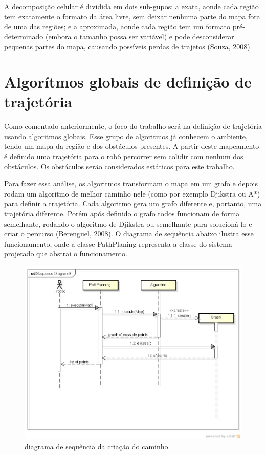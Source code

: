 A decomposição celular é dividida em dois sub-gupos: a exata, aonde cada região tem exatamente o formato da área livre, sem deixar nenhuma parte do mapa fora de uma das regiões; e a aproximada, aonde cada região tem um formato pré-determinado (embora o tamanho possa ser variável) e pode desconsiderar pequenas partes do mapa, causando possíveis perdas de trajetos (Souza, 2008).

\section{Algorítmos globais de definição de trajetória}

Como comentado anteriormente, o foco do trabalho será na definição de trajetória usando algoritmos globais. Esse grupo de algoritmos já conhecem o ambiente, tendo um mapa da região e dos obstáculos presentes. A partir deste mapeamento é definido uma trajetória para o robô percorrer sem colidir com nenhum dos obstáculos. Os obstáculos serão considerados estáticos para este trabalho.

Para fazer essa análise, os algoritmos transformam o mapa em um grafo e depois rodam um algoritmo de melhor caminho nele (como por exemplo Djikstra ou A*) para definir a trajetória. Cada algoritmo gera um grafo diferente e, portanto, uma trajetória diferente. Porém após definido o grafo todos funcionam de forma semelhante, rodando o algoritmo de Djikstra ou semelhante para solucioná-lo e criar o percurso (Berenguel, 2008). O diagrama de sequência abaixo ilustra esse funcionamento, onde a classe PathPlaning representa a classe do sistema projetado que abstrai o funcionamento.

\begin{figure}[h]
	\centering
	\label{fig06}
		\includegraphics[keepaspectratio=true,scale=0.6]{figuras/5diagramaSequencia.png}
	\caption{diagrama de sequência da criação do caminho}
\end{figure}

